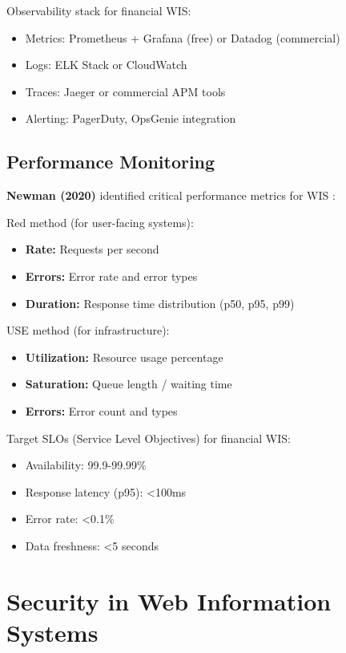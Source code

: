 \documentclass[conference]{IEEEtran}
\begin{document}
\begin{enumerate}
Observability stack for financial WIS:
\begin{itemize}
    \item Metrics: Prometheus + Grafana (free) or Datadog (commercial)
    \item Logs: ELK Stack or CloudWatch
    \item Traces: Jaeger or commercial APM tools
    \item Alerting: PagerDuty, OpsGenie integration
\end{itemize}

\subsection{Performance Monitoring}

\textbf{Newman (2020)} identified critical performance metrics for WIS \cite{newman2020observability}:

Red method (for user-facing systems):
\begin{itemize}
    \item \textbf{Rate:} Requests per second
    \item \textbf{Errors:} Error rate and error types
    \item \textbf{Duration:} Response time distribution (p50, p95, p99)
\end{itemize}

USE method (for infrastructure):
\begin{itemize}
    \item \textbf{Utilization:} Resource usage percentage
    \item \textbf{Saturation:} Queue length / waiting time
    \item \textbf{Errors:} Error count and types
\end{itemize}

Target SLOs (Service Level Objectives) for financial WIS:
\begin{itemize}
    \item Availability: 99.9-99.99\%
    \item Response latency (p95): <100ms
    \item Error rate: <0.1\%
    \item Data freshness: <5 seconds
\end{itemize}

\section{Security in Web Information Systems}


\end{enumerate}
\end{document}
